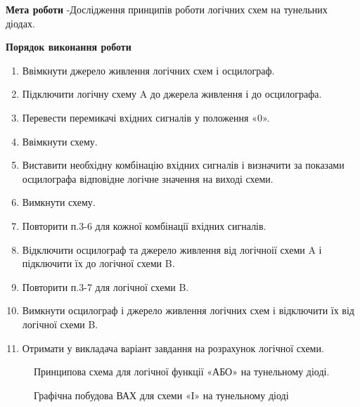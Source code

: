 \documentclass[a4paper,14pt]{extreport}
\begin{document}
\textbf{Мета роботи} -Дослідження принципів роботи логічних схем на тунельних діодах.
\begin{center}
\textbf{Порядок виконання роботи}
\end{center}
	\begin{enumerate}
	\item Ввімкнути джерело живлення логічних схем і осцилограф. 
	\item Підключити логічну схему A до джерела живлення і до осцилографа. 
	\item  Перевести перемикачі вхідних сигналів у положення «0». 
	\item  Ввімкнути схему. 
	\item  Виставити необхідну комбінацію вхідних сигналів і визначити за показами осцилографа відповідне логічне значення на виході схеми. 
	\item  Вимкнути схему. 
	\item  Повторити п.3-6 для кожної комбінації вхідних сигналів. 
	\item  Відключити осцилограф та джерело живлення від логічноії схеми A і підключити їх до логічної схеми B. 
	\item  Повторити п.3-7 для логічної схеми B. 
	\item  Вимкнути осцилограф і джерело живлення логічних схем і відключити їх від логічної схеми B. 
	\item  Отримати у викладача варіант завдання на розрахунок логічної схеми.
	\end{enumerate}

\begin{figure}[h!]
	\caption{Принципова схема для логічної функції «АБО» на тунельному діоді.}
	\label{ris1}
\end{figure}

\begin{figure}[h!]
	\caption{Графічна побудова ВАХ для схеми «І» на тунельному діоді}
	\label{ris1}
\end{figure}
\end{document}
